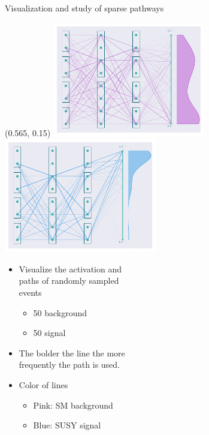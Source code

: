 \documentclass[UKenglish]{beamer}
\begin{document}
\begin{frame}[noframenumbering]{Visualization and study of sparse pathways}
    \begin{textblock}{0.8}(0.565, 0.15)
        \includegraphics[width = 0.5\textwidth]{figures/NetworkVis/AfterTrainingBkg.pdf}
        \includegraphics[width = 0.5\textwidth]{figures/NetworkVis/AfterTrainingSig.pdf}
    \end{textblock}
    \begin{itemize}
        \item Visualize the activation and \\
        paths of randomly sampled \\
        events
        \begin{itemize}
            \item 50 background
            \item 50 signal
        \end{itemize}
        \item The bolder the line the more\\ 
        frequently the path is used.
        \item Color of lines 
        \begin{itemize}
            \item Pink: SM background
            \item Blue: SUSY signal
        \end{itemize}
    \end{itemize}
\end{frame}
\end{document}
